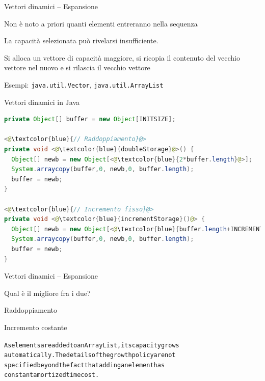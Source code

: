 \begin{frame}{Vettori dinamici -- Espansione}


\vspace{-9pt}
\begin{myboxtitle}[Problema]
\BI
\item Non è noto a priori quanti elementi entreranno nella sequenza
\item La capacità selezionata può rivelarsi insufficiente.
\EI
\end{myboxtitle}

\begin{myboxtitle}[Soluzione]
\BI
\item Si alloca un vettore di capacità maggiore, si ricopia il contenuto del vecchio vettore nel nuovo e si rilascia il vecchio vettore
\item Esempi: \texttt{java.util.Vector}, \texttt{java.util.ArrayList}
\EI
\end{myboxtitle}


\end{frame}

\begin{frame}{Vettori dinamici in Java}

\begin{lstlisting}[language=java]
private Object[] buffer = new Object[INITSIZE];

<@\textcolor{blue}{// Raddoppiamento}@>
private void <@\textcolor{blue}{doubleStorage}@>() {
  Object[] newb = new Object[<@\textcolor{blue}{2*buffer.length}@>];
  System.arraycopy(buffer,0, newb,0, buffer.length);
  buffer = newb;
}

<@\textcolor{blue}{// Incremento fisso}@>
private void <@\textcolor{blue}{incrementStorage}()@> {
  Object[] newb = new Object[<@\textcolor{blue}{buffer.length+INCREMENT}@>];
  System.arraycopy(buffer,0, newb,0, buffer.length);
  buffer = newb;
}
\end{lstlisting}
	
\end{frame}



\begin{frame}[fragile]{Vettori dinamici -- Espansione}

\vspace{-9pt}
\begin{myboxtitle}[Domanda]
Qual è il migliore fra i due?
\BI
\item Raddoppiamento
\item Incremento costante
\EI
\end{myboxtitle}

\begin{myboxtitle}
\begin{alltt}
As elements are added to an \alert{ArrayList}, its capacity grows 
automatically. The details of the growth policy are not 
specified beyond the fact that adding an element has 
\alert{constant} amortized time cost.
\end{alltt}
\end{myboxtitle}


\end{frame}

